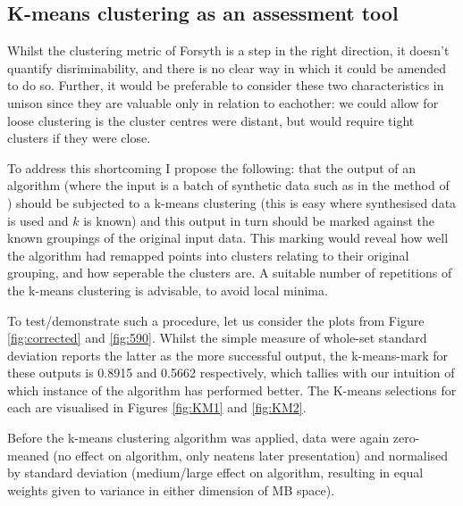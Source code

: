 \subsection{K-means clustering as an assessment tool}

Whilst the clustering metric of Forsyth is a step in the right direction, it doesn't quantify disriminability, and there is no clear way in which it could be amended to do so. Further, it would be preferable to consider these two characteristics in unison since they are valuable only in relation to eachother: we could allow for loose clustering is the cluster centres were distant, but would require tight clusters if they were close. 

To address this shortcoming I propose the following: that the output of an algorithm (where the input is a batch of synthetic data such as in the method of \citet{barnard_comparison_2002}) should be subjected to a k-means clustering (this is easy where synthesised data is used and $k$ is known) and this output in turn should be marked against the known groupings of the original input data. This marking would reveal how well the algorithm had remapped points into clusters relating to their original grouping, and how seperable the clusters are. A suitable number of repetitions of the k-means clustering is advisable, to avoid local minima. 


To test/demonstrate such a procedure, let us consider the plots from Figure \ref{fig:corrected} and \ref{fig:590}. Whilst the simple measure of whole-set standard deviation reports the latter as the more successful output, the k-means-mark for these outputs is 0.8915 and 0.5662 respectively, which tallies with our intuition of which instance of the algorithm has performed better. The K-means selections for each are visualised in Figures \ref{fig:KM1} and \ref{fig:KM2}.

Before the k-means clustering algorithm was applied, data were again zero-meaned (no effect on algorithm, only neatens later presentation) and normalised by standard deviation (medium/large effect on algorithm, resulting in equal weights given to variance in either dimension of \gls{MB} space).


